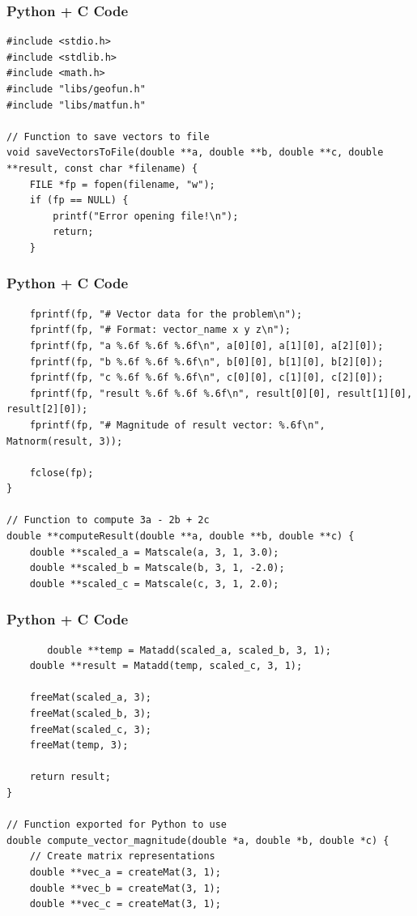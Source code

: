 \documentclass{beamer}
\begin{document}
\begin{frame}[fragile]
    \frametitle{Python + C Code}
    \begin{lstlisting}
#include <stdio.h>
#include <stdlib.h>
#include <math.h>
#include "libs/geofun.h"
#include "libs/matfun.h"

// Function to save vectors to file
void saveVectorsToFile(double **a, double **b, double **c, double **result, const char *filename) {
    FILE *fp = fopen(filename, "w");
    if (fp == NULL) {
        printf("Error opening file!\n");
        return;
    }
    \end{lstlisting}
\end{frame}


\begin{frame}[fragile]
    \frametitle{Python + C Code}
    \begin{lstlisting}   
    fprintf(fp, "# Vector data for the problem\n");
    fprintf(fp, "# Format: vector_name x y z\n");
    fprintf(fp, "a %.6f %.6f %.6f\n", a[0][0], a[1][0], a[2][0]);
    fprintf(fp, "b %.6f %.6f %.6f\n", b[0][0], b[1][0], b[2][0]);
    fprintf(fp, "c %.6f %.6f %.6f\n", c[0][0], c[1][0], c[2][0]);
    fprintf(fp, "result %.6f %.6f %.6f\n", result[0][0], result[1][0], result[2][0]);
    fprintf(fp, "# Magnitude of result vector: %.6f\n", Matnorm(result, 3));
    
    fclose(fp);
}

// Function to compute 3a - 2b + 2c
double **computeResult(double **a, double **b, double **c) {
    double **scaled_a = Matscale(a, 3, 1, 3.0);
    double **scaled_b = Matscale(b, 3, 1, -2.0);
    double **scaled_c = Matscale(c, 3, 1, 2.0);
    \end{lstlisting}
\end{frame}


\begin{frame}[fragile]
    \frametitle{Python + C Code}
    \begin{lstlisting}
       double **temp = Matadd(scaled_a, scaled_b, 3, 1);
    double **result = Matadd(temp, scaled_c, 3, 1);
    
    freeMat(scaled_a, 3);
    freeMat(scaled_b, 3);
    freeMat(scaled_c, 3);
    freeMat(temp, 3);
    
    return result;
}

// Function exported for Python to use
double compute_vector_magnitude(double *a, double *b, double *c) {
    // Create matrix representations
    double **vec_a = createMat(3, 1);
    double **vec_b = createMat(3, 1);
    double **vec_c = createMat(3, 1);
    \end{lstlisting}
\end{frame}
\end{document}

